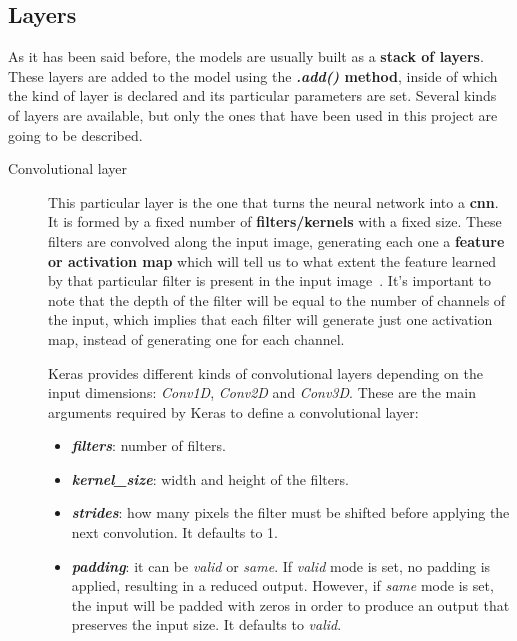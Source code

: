 \subsection{Layers}\label{subsec:layers}
As it has been said before, the models are usually built as a \textbf{stack of layers}. These layers are added to the model using the \textbf{\textit{.add()} method}, inside of which the kind of layer is declared and its particular parameters are set. Several kinds of layers are available, but only the ones that have been used in this project are going to be described.
\begin{description}
	\item[Convolutional layer] This particular layer is the one that turns the neural network into a \textbf{\gls{cnn}}. It is formed by a fixed number of \textbf{filters/kernels} with a fixed size. These filters are convolved along the input image, generating each one a \textbf{feature or activation map} which will tell us to what extent the feature learned by that particular filter is present in the input image~\cite{cs231n}. It's important to note that the depth of the filter will be equal to the number of channels of the input, which implies that each filter will generate just one activation map, instead of generating one for each channel. 
	
	Keras provides different kinds of convolutional layers depending on the input dimensions: \textit{Conv1D}, \textit{Conv2D} and \textit{Conv3D}. These are the main arguments required by Keras to define a convolutional layer:
	\begin{itemize}
		\item \textbf{\textit{filters}}: number of filters.
		
		\item \textbf{\textit{kernel\_size}}: width and height of the filters.
		
		\item \textbf{\textit{strides}}: how many pixels the filter must be shifted before applying the next convolution. It defaults to 1.
		
		\item \textbf{\textit{padding}}: it can be \textit{valid} or \textit{same}. If \textit{valid} mode is set, no padding is applied, resulting in a reduced output. However, if \textit{same} mode is set, the input will be padded with zeros in order to produce an output that preserves the input size. It defaults to \textit{valid}.
	\end{itemize}


\end{description}
